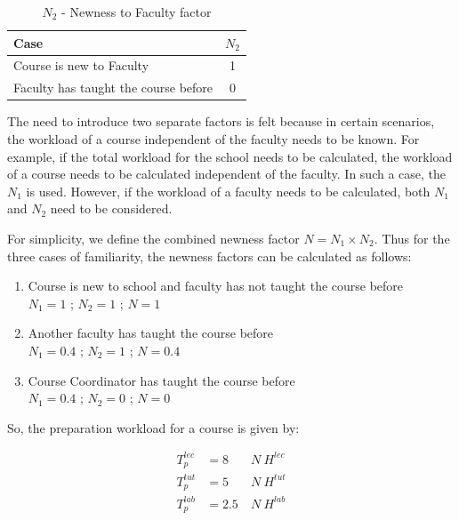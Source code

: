 \begin{table}[ht]
  \label{tab:n2-workload-factor}
  \centering
  \begin{tabular}{|l|c|}
    \hline
    \textbf{Case}                        & \textbf{\(N_2\)} \\ \hline
    Course is new to Faculty             & 1                \\ \hline
    Faculty has taught the course before & 0                \\ \hline
  \end{tabular}
  \caption{\(N_2\) - Newness to Faculty factor}
\end{table}

The need to introduce two separate factors is felt because in certain scenarios, the workload of a course independent of the faculty needs to be known. For example, if the total workload for the school needs to be calculated, the workload of a course needs to be calculated independent of the faculty. In such a case, the \(N_1\) is used. However, if the workload of a faculty needs to be calculated, both \(N_1\) and \(N_2\) need to be considered.

For simplicity, we define the combined newness factor \(N = N_1 \times N_2\). Thus for the three cases of familiarity, the newness factors can be calculated as follows:

\begin{enumerate}
  \item Course is new to school and faculty has not taught the course before       \\
        \(N_1 = 1\) ; \(N_2 = 1\) ; \(N = 1\)
  \item Another faculty has taught the course before \\
        \(N_1 = 0.4\) ; \(N_2 = 1\) ; \(N = 0.4\)
  \item Course Coordinator has taught the course before     \\
        \(N_1 = 0.4\) ; \(N_2 = 0\) ; \(N = 0\)
\end{enumerate}

So, the preparation workload for a course is given by:

\begin{equation}
  \begin{aligned}
    T_p^{lec} & = 8   & \ N \ H^{lec} \\
    T_p^{tut} & = 5   & \ N \ H^{tut} \\
    T_p^{lab} & = 2.5 & \ N \ H^{lab}
  \end{aligned}
\end{equation}

